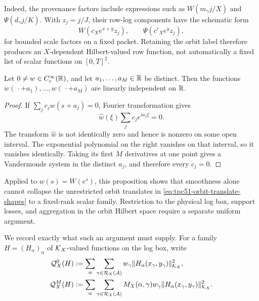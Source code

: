 Indeed, the provenance factors include expressions such as
\(W(m_\gamma j/X)\) and \(\Psi(d_\gamma j/K)\).  With
\(z_j=j/J\), their row-log components have the schematic form
\begin{equation}
 W(c_Xe^{x+y}z_j),
 \qquad
 \Psi(c'_Xe^yz_j),
 \label{eq:tpc51-orbit-translate-shapes}
\end{equation}
for bounded scale factors on a fixed packet.  Retaining the orbit label
therefore produces an \(X\)-dependent Hilbert-valued row function, not
automatically a fixed list of scalar functions on \([0,T]^2\).

\begin{proposition}
\label{prop:tpc51-translate-independence}
Let \(0\ne w\in C_c^\infty(\mathbb R)\), and let
\(a_1,\ldots,a_M\in\mathbb R\) be distinct.  Then the functions
\(w(\,\cdot+a_1),\ldots,w(\,\cdot+a_M)\) are linearly independent on
\(\mathbb R\).
\end{proposition}

\begin{proof}
If \(\sum_jc_jw(s+a_j)=0\), Fourier transformation gives
\[
 \widehat w(\xi)\sum_jc_je^{ia_j\xi}=0.
\]
The transform \(\widehat w\) is not identically zero and hence is
nonzero on some open interval.  The exponential polynomial on the
right vanishes on that interval, so it vanishes identically.  Taking
its first \(M\) derivatives at one point gives a Vandermonde system in
the distinct \(a_j\), and therefore every \(c_j=0\).
\end{proof}

Applied to \(w(s)=W(e^s)\), this proposition shows that smoothness alone
cannot collapse the unrestricted orbit translates in
\eqref{eq:tpc51-orbit-translate-shapes} to a fixed-rank scalar family.
Restriction to the physical log box, support losses, and aggregation in
the orbit Hilbert space require a separate uniform argument.

We record exactly what such an argument must supply.  For a family
\(H=(H_\alpha)_\alpha\) of \(\mathcal K_X\)-valued functions on the log box,
write
\begin{align}
 \mathcal Q_X^0(H)
 &:=\sum_\alpha\sum_{\gamma\in\mathcal R_X(\mathcal A)}
 w_\gamma\|H_\alpha(x_\gamma,y_\gamma)\|_{\mathcal K_X}^2,
 \notag\\
 \mathcal Q_X^M(H)
 &:=\sum_\alpha\sum_{\gamma\in\mathcal R_X(\mathcal A)}
 M_X(\alpha,\gamma)w_\gamma
 \|H_\alpha(x_\gamma,y_\gamma)\|_{\mathcal K_X}^2.
 \label{eq:tpc51-bridge-quadratic-forms}
\end{align}

